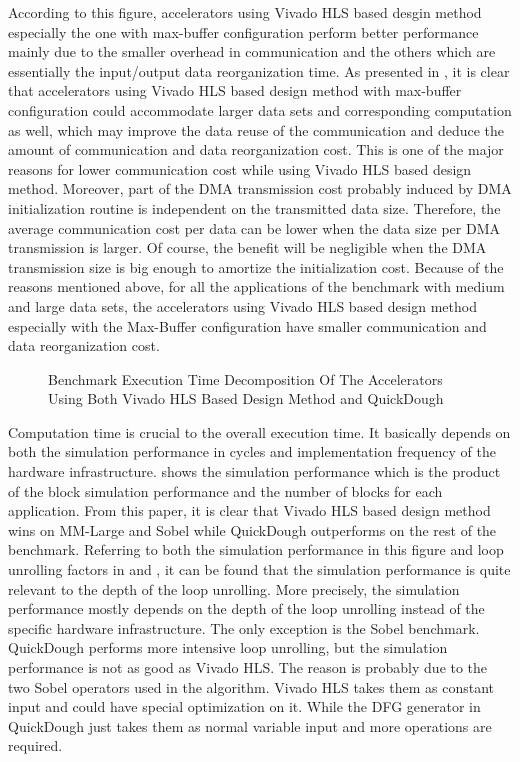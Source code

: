 According to this figure, accelerators using Vivado HLS based desgin method especially the one with max-buffer configuration perform better performance mainly due to the smaller overhead in communication and the others which are essentially the input/output data reorganization time. As presented in , it is clear that accelerators using Vivado HLS based design method with max-buffer configuration could accommodate larger data sets and corresponding computation as well, which may improve the data reuse of the communication and deduce the amount of communication and data reorganization cost. This is one of the major reasons for lower communication cost while using Vivado HLS based design method. Moreover, part of the DMA transmission cost probably induced by DMA initialization routine is independent on the transmitted data size. Therefore, the average communication cost per data can be lower when the data size per DMA transmission is larger. Of course, the benefit will be negligible when the DMA transmission size is big enough to amortize the initialization cost. Because of the reasons mentioned above, for all the applications of the benchmark with medium and large data sets, the accelerators using Vivado HLS based design method especially with the Max-Buffer configuration have smaller communication and data reorganization cost.

\begin{figure*}[h]
\caption{Benchmark Execution Time Decomposition Of The Accelerators Using Both Vivado HLS Based Design Method and QuickDough}
\label{fig:execution-time}
\end{figure*}

Computation time is crucial to the overall execution time. It basically depends on both the simulation performance in cycles and implementation frequency of the hardware infrastructure.  shows the simulation performance which is the product of the block simulation performance and the number of blocks for each application. From this paper, it is clear that Vivado HLS based design method wins on MM-Large and Sobel while QuickDough outperforms on the rest of the benchmark. Referring to both the simulation performance in this figure and loop unrolling factors in  and , it can be found that the simulation performance is quite relevant to the depth of the loop unrolling. More precisely, the simulation performance mostly depends on the depth of the loop unrolling instead of the specific hardware infrastructure. The only exception is the Sobel benchmark. QuickDough performs more intensive loop unrolling, but the simulation performance is not as good as Vivado HLS. The reason is probably due to the two Sobel operators used in the algorithm. Vivado HLS takes them as constant input and could have special optimization on it. While the DFG generator in QuickDough just takes them as normal variable input and more operations are required. 

